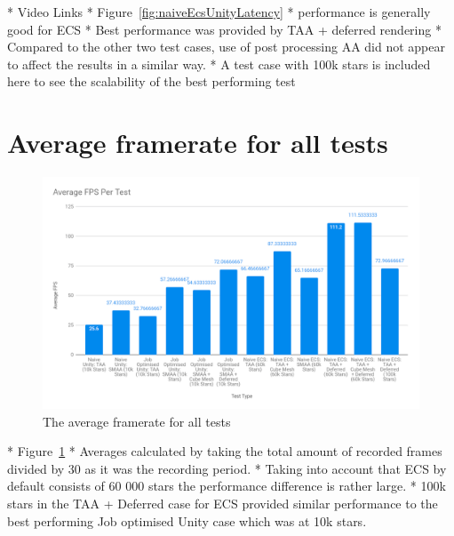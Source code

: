 * Video Links
* Figure~\ref{fig:naiveEcsUnityLatency}
* performance is generally good for ECS
* Best performance was provided by TAA + deferred rendering
* Compared to the other two test cases, use of post processing AA did not appear to affect the results in a similar way. 
* A test case with 100k stars is included here to see the scalability of the best performing test

\section{Average framerate for all tests}
\begin{figure}[!p]
    \centering
    \includegraphics[width=1\textwidth]{Figures/averageFpsPerTest.png}
    \caption[Average Framerate Per Test]{The average framerate for all tests}
    \label{fig:averageFPS}
\end{figure}

* Figure~\ref{fig:averageFPS}
* Averages calculated by taking the total amount of recorded frames divided by 30 as it was the recording period.
* Taking into account that ECS by default consists of 60 000 stars the performance difference is rather large. 
* 100k stars in the TAA + Deferred case for ECS provided similar performance to the best performing Job optimised Unity case which was at 10k stars. 